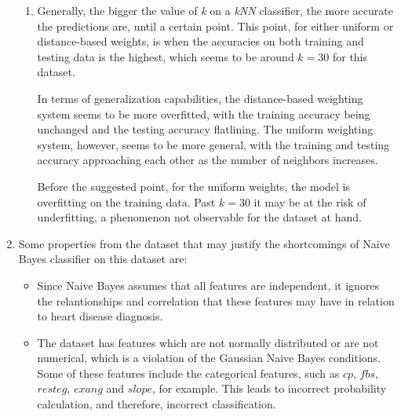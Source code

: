 \documentclass[12pt]{article}
\begin{document}
\begin{enumerate}[leftmargin=\labelsep, label=\textbf{\arabic*.)}]
\begin{enumerate}[label=\textbf{\alph*.)}]
              \item Generally, the bigger the value of \textit{k} on a \textit{kNN} classifier, the more accurate the predictions are, until a certain point. This point, for either uniform or distance-based weights, is when the accuracies on both training and testing data is the highest, which seems to be around $k = 30$ for this dataset.


                    In terms of generalization capabilities, the distance-based weighting system seems to be more overfitted, with the training accuracy being unchanged and the testing accuracy flatlining. The uniform weighting system, however, seems to be more general, with the training and testing accuracy approaching each other as the number of neighbors increases.

                    Before the suggested point, for the uniform weights, the model is overfitting on the training data.
                    Past $k=30$ it may be at the risk of underfitting, a phenomenon not observable for the dataset at hand.

          \end{enumerate}

    \item Some properties from the dataset that may justify the shortcomings of Naive Bayes classifier on this dataset are:
          \begin{itemize}
              \item Since Naive Bayes assumes that all features are independent, it ignores the relantionships and correlation that these features may have in relation to heart disease diagnosis.
              \item The dataset has features which are not normally distributed or are not numerical, which is a violation of the Gaussian Naive Bayes conditions. Some of these features include the categorical features, such as $cp$, $fbs$, $resteg$, $exang$ and $slope$, for example. This leads to incorrect probability calculation, and therefore, incorrect classification.
          \end{itemize}

\end{enumerate}
\end{document}
